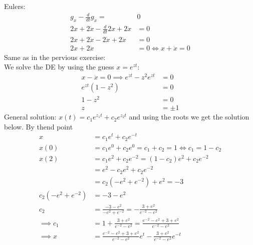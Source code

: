 \documentclass{article}
\begin{document}
	Eulers: 
	\begin{align}
		g_x - \frac{d}{dt} g_{\dot{x}} =& 0\\
		2x +2\dot{x} - \frac{d}{dt}2x +2\dot{x}	 &= 0\\
		2x +2\dot{x} - 2\dot{x} +2\ddot{x} &= 0\\
		2x +2\ddot{x} &= 0 \iff x +\ddot{x} = 0
	\end{align}
	Same as in the pervious exercise: \\
	We solve the DE by using the guess $x = e^{z t}$:
	\begin{align}
		x - \ddot{x} = 0 \implies e^{z t} - z^2 e^{z t} &= 0 \\
		e^{z t}(1 - z^2) &= 0\\
		1 - z^2 &= 0\\
		z &= \pm 1
	\end{align}
	General solution: $x(t) = c_1 e^{z_1 t} + c_2 e^{z_2 t}$ and using the roots we get the solution below. By thend point 
	\begin{align}
		x &= c_1 e^{t} + c_2 e^{- t}\\
		x(0) &= c_1 e^0 + c_2 e^{0} = c_1 + c_2 = 1 \iff c_1 = 1 - c_2\\
		x(2) &= c_1 e^{2} + c_2 e^{-2} = (1-c_2)e^{2} + c_2 e^{-2} \\
		&= e^{2}-c_2e^{2} + c_2 e^{-2}\\
		&= c_2(-e^{2} + e^{-2}) +e^{2} = -3\\
		c_2(-e^{2} + e^{-2}) &= -3 - e^{2}\\
		c_2 &= \frac{-3 - e^{2}}{-e^{2} + e^{-2}} = -\frac{3 + e^{2}}{e^{-2} -e^{2}}\\
		\implies c_1 &= 1 + \frac{3 + e^{2}}{e^{-2} -e^{2}} = \frac{e^{-2} -e^{2} + 3 + e^{2}}{e^{-2} -e^{2}}\\
		\implies x &= \frac{e^{-2} -e^{2} + 3 + e^{2}}{e^{-2} -e^{2}} e^{t} -\frac{3 + e^{2}}{e^{-2} -e^{2}} e^{- t}\\
	\end{align}
\end{document}
